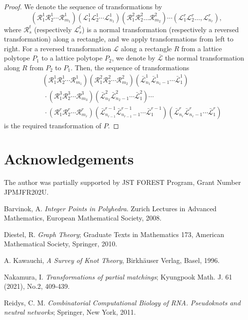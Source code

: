 \documentclass[a4paper,11pt]{amsart}
\numberwithin{equation}{section}
\begin{document}
\begin{proof}
We denote the sequence of transformations by  
\[
(\mathcal{R}^1_1 \mathcal{R}^1_2 \cdots \mathcal{R}^1_{m_1}) (\mathcal{L}^1_1 \mathcal{L}^1_2 \cdots \mathcal{L}^1_{n_1})
(\mathcal{R}^2_1 \mathcal{R}^2_2 \ldots \mathcal{R}^2_{m_2}) \cdots (\mathcal{L}^r_1 \mathcal{L}^r_2 \ldots, \mathcal{L}^r_{n_r}), 
\]
where $\mathcal{R}_s^t$ (respectively $\mathcal{L}_s^t$) is a normal  transformation (respectively a reversed transformation) along a rectangle, and we apply transformations from left to right. 
For a reversed transformation $\mathcal{L}$ along a rectangle $R$ from a lattice polytope $P_1$ to a lattice polytope $P_2$, we denote by $\mathcal{\bar{L}}$ the normal transformation along $R$ from $P_2$ to $P_1$. Then, 
the sequence of transformations 
\begin{eqnarray*}&&
(\mathcal{R}^1_1 \mathcal{R}^1_2 \cdots \mathcal{R}^1_{m_1}) 
(\mathcal{R}^2_1 \mathcal{R}^2_2 \cdots \mathcal{R}^2_{m_2}) (\mathcal{\bar{L}}^1_{n_1} \mathcal{\bar{L}}^1_{n_1-1} \cdots \mathcal{\bar{L}}^1_{1})\\
&&
\ \cdot (\mathcal{R}^3_1 \mathcal{R}^3_2 \cdots \mathcal{R}^3_{m_3})
%
(\mathcal{\bar{L}}^2_{n_2}\mathcal{\bar{L}}^2_{n_2-1}\cdots \mathcal{\bar{L}}^2_{1}) \cdots\\
&&
\ \cdot (\mathcal{R}^r_1 \mathcal{R}^r_2 \cdots \mathcal{R}^r_{m_r})
%
(\mathcal{\bar{L}}^{r-1}_{n_{r-1}}\mathcal{\bar{L}}^{r-1}_{n_{r-1}-1}\cdots \mathcal{\bar{L}}^{r-1}_{1})
(\mathcal{\bar{L}}^r_{n_r} \mathcal{\bar{L}}^r_{n_r-1} \cdots \mathcal{\bar{L}}^r_{1})
\end{eqnarray*}
is the required transformation of $P$. 
\end{proof}

\section*{Acknowledgements}
The author was partially supported by JST FOREST Program, Grant Number JPMJFR202U. 

\begin{thebibliography}{0}

Barvinok, A. {\em Integer Points in Polyhedra}. Zurich Lectures in Advanced Mathematics, European Mathematical Society, 2008.


Diestel, R. {\em Graph Theory}; Graduate Texts in Mathematics 173, American Mathematical Society, Springer, 2010. 

A. Kawauchi, {\it A Survey of Knot Theory}, 
Birkh\"{a}user Verlag, Basel, 1996. 

Nakamura, I. {\em Transformations of partial matchings}; Kyungpook Math. J. 61 (2021), No.2, 409-439. 

 
Reidys, C. M. {\em Combinatorial Computational Biology of RNA. Pseudoknots and neutral networks}; Springer, New York, 2011.


\end{thebibliography}
\end{document}
